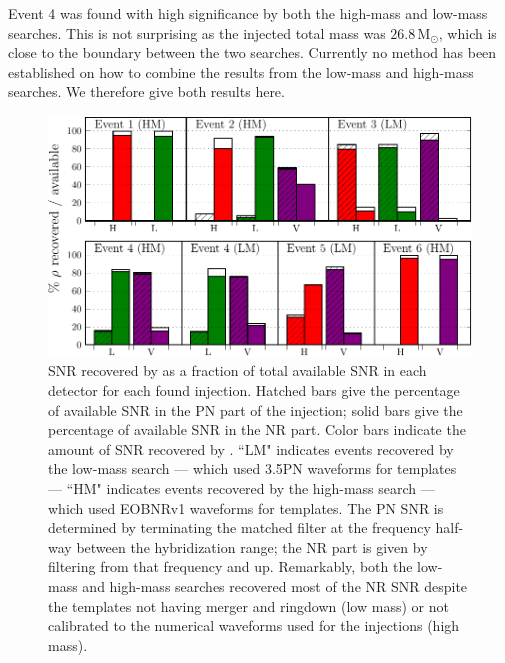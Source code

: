 Event 4 was found with high significance by both the high-mass and low-mass
searches. This is not surprising as the injected total mass was
$26.8\,\mathrm{M}_\odot$, which is close to the boundary between the two
searches. Currently no method has been established on how to combine the
results from the low-mass and high-mass searches. We therefore give both
results here.

\begin{figure}
  \centerline{\includegraphics[width=\columnwidth]{papers/mdc2013_submission/figure5}}
  \caption[SNR distribution]{\label{fig:snrDistribution}
SNR recovered by \ihope{} as a fraction of total available SNR in each detector
for each found injection. Hatched bars give the percentage of available SNR in
the PN part of the injection; solid bars give the percentage of available SNR
in the NR part. Color bars indicate the amount of SNR recovered by \ihope{}.
``LM" indicates events recovered by the low-mass search --- which used 3.5PN
waveforms for templates --- ``HM" indicates events recovered by the high-mass
search --- which used EOBNRv1 waveforms for templates. The PN SNR is determined
by terminating the matched filter at the frequency half-way between the
hybridization range; the NR part is given by filtering from that frequency and
up.  Remarkably, both the low-mass and high-mass searches recovered most of the
NR SNR despite the templates not having merger and ringdown (low mass) or not
calibrated to the numerical waveforms used for the injections (high mass).
  }
\end{figure}

